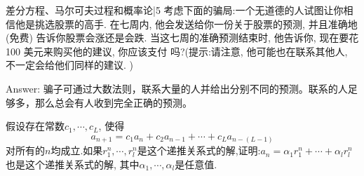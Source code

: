 \newChapter 差分方程、马尔可夫过程和概率论|5
\exer 考虑下面的骗局:一个无道德的人试图让你相信他是挑选股票的高手. 在七周内, 他会发送给你一份关于股票的预测, 并且准确地 (免费) 告诉你股票会涨还是会跌. 当这七周的准确预测结束时, 他告诉你, 现在要花 100 美元来购买他的建议, 你应该支付
吗?(提示:请注意, 他可能也在联系其他人, 不一定会给他们同样的建议. )\par
Answer: 骗子可通过大数法则，联系大量的人并给出分别不同的预测。联系的人足够多，那么总会有人收到完全正确的预测。

\exer 假设存在常数$c_1,\cdots,c_L$, 使得
\[a_{n+1}=c_1a_n+c_2a_{n-1}+\cdots+c_La_{n-(L-1)}\]
对所有的$n$均成立.如果$r_1^n,\cdots,r_l^n$是这个递推关系式的解,证明:$a_n =\alpha_1 r_1^n+\cdots+\alpha_l r_l^n$也是这个递推关系式的解, 其中$\alpha_1 ,\cdots,\alpha_l$是任意值.